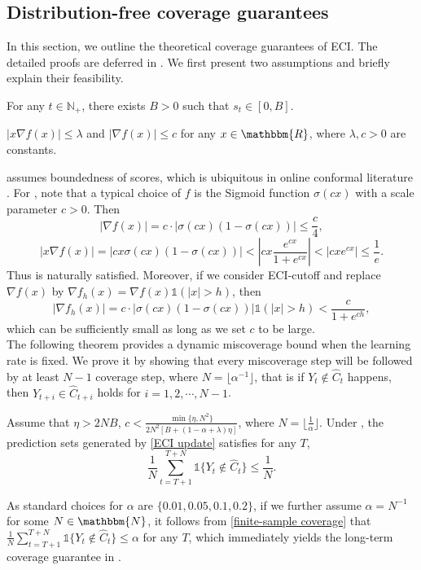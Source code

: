 \subsection{Distribution-free coverage guarantees}
\vspace{-0.25em}
In this section, we outline the theoretical coverage guarantees of ECI. The detailed proofs are deferred in .  We first present two assumptions and briefly explain their feasibility. 

\begin{assumption}
    \label{assumption1}
     For any $t \in \mathbb{N_+}$, there exists $B>0$  such that $s_t \in [0,B]$.

\end{assumption}
\begin{assumption}
    \label{assumption2}
   $|x\nabla f(x)|\leq \lambda$ and $|\nabla f(x)|\leq c$ for any $x \in \mathbbm{R}$, where $\lambda, c>0$ are constants. 
\end{assumption}
 assumes boundedness of scores, which is ubiquitous in online conformal literature \citep{aci_gibbs2021adaptive,pid_angelopoulos2024conformal,angelopoulos2024online}. For , note that a typical choice of $f$ is the Sigmoid function $\sigma(cx)$ with a scale parameter $c>0$. Then $$|\nabla f(x)|=c \cdot |\sigma(cx)(1-\sigma(cx))|\leq \frac{c}{4},$$
$$|x \nabla f(x)|=|cx\sigma(cx)(1-\sigma(cx))|<|cx \frac{e^{cx}}{1+e^{cx}}|<|cxe^{cx}|\leq\frac{1}{e}.$$  Thus  is naturally satisfied. Moreover, if we consider ECI-cutoff and replace $\nabla f(x)$ by  $\nabla f_{h}(x)=\nabla f(x)\mathds{1}(|x|>h)$, then $$|\nabla f_h(x)|=c \cdot |\sigma(cx)(1-\sigma(cx))|\mathds{1}(|x|>h)<\frac{c}{1+e^{ch}},$$ 
which can be sufficiently small as long as we set $c$ to be large.\\

The following theorem provides a dynamic miscoverage bound when the learning rate is fixed. We prove it by showing that every miscoverage step will be followed by at least $N-1$ coverage step, where $N=\lfloor \alpha^{-1} \rfloor$, that is if $Y_t \notin \hat{C}_t$ happens, then $Y_{t+i} \in \hat{C}_{t+i}$ holds for $i=1,2,\cdots, N-1$.
\begin{theorem}
\label{theorem1}
    Assume that $\eta>2NB$, $c<\frac{\min\{\eta,N^2\}}{2N^2\left[B+(1-\alpha+\lambda)\eta\right]}$, where $N=\lfloor \frac{1}{\alpha} \rfloor$. Under , the prediction sets generated by \eqref{ECI update} satisfies for any $T$,
    \begin{equation}
    \label{finite-sample coverage}
        \frac{1}{N}\sum_{t=T+1}^{T+N} \mathds{1}\{Y_t \notin \hat{C}_t\}\leq \frac{1}{N}.
    \end{equation}
\end{theorem}
As standard choices for $\alpha$ are $\{0.01,0.05,0.1,0.2\}$, if we further assume $\alpha=N^{-1}$ for some $N \in \mathbbm{N}$, it follows from \eqref{finite-sample coverage} that $\frac{1}{N}\sum_{t=T+1}^{T+N} \mathds{1}\{Y_t \notin \hat{C}_t\}\leq \alpha$ for any $T$, which immediately yields the long-term coverage guarantee in .


